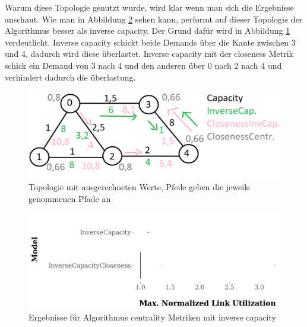 \documentclass[sigconf, nonacm, review]{acmart}
\begin{document}
Warum diese Topologie genutzt wurde, wird klar wenn man sich die Ergebnisse anschaut.
Wie man in Abbildung \ref{fig:kai_p2_results} sehen kann, performt auf dieser Topologie der Algorithmus besser als inverse capacity.
Der Grund daf\"ur wird in Abbildung \ref{fig:kai_p2_AdTopo} verdeutlicht.
Inverse capacity schickt beide Demands \"uber die Kante zwischen 3 und 4, dadurch wird diese \"uberlastet.
Inverse capacity mit der closeness Metrik schick ein Demand von 3 nach 4 und den anderen \"uber 0 nach 2 nach 4 und verhindert dadurch die \"uberlastung.
\begin{figure}
\centering
\includegraphics[width=\linewidth]{figures/kai_p2_TopoAd.png}
\caption{Topologie mit ausgerechneten Werte, Pfeile geben die jeweils genommenen Pfade an}
\label{fig:kai_p2_AdTopo}
\end{figure}
\begin{figure}
\centering
\includegraphics[width=\linewidth]{figures/kai_p2_results.png}
\caption{Ergebnisse f\"ur Algorithmus centrality Metriken mit inverse capacity}
\label{fig:kai_p2_results}
\end{figure}
\end{document}
